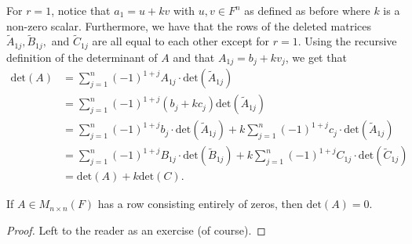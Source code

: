 \begin{remark}
   For \( r = 1  \), notice that \( {a}_{1} = u + kv  \) with \( u,v \in F^{n} \) as defined as before where \( k  \) is a non-zero scalar. Furthermore, we have that the rows of the deleted matrices \( {\tilde{A}}_{1j}, {\tilde{B}}_{1j},  \) and \( {\tilde{C}}_{1j} \) are all equal to each other except for \( r = 1  \). Using the recursive definition of the determinant of \( A  \) and that \( {A}_{1j} = {b}_{j} + k {v}_{j} \), we get that
   \begin{align*}
       \text{det}(A) &= \sum_{ j=1 }^{ n } (-1)^{1+j} {A}_{1j} \cdot \text{det}({\tilde{A}}_{1j}) \\
                     &= \sum_{ j=1 }^{ n } (-1)^{1+j} ({b}_{j} + {kc}_{j}) \text{det}({\tilde{A}}_{1j}) \\
                     &= \sum_{ j=1 }^{ n } (-1)^{1+j} {b}_{j} \cdot \text{det}({\tilde{A}}_{1j}) + k \sum_{ j=1 }^{ n } (-1)^{1+j}{c}_{j} \cdot \text{det} ({\tilde{A}}_{1j}) \\
                     &= \sum_{ j=1 }^{ n } (-1)^{1+j} {B}_{1j} \cdot \text{det}({\tilde{B}}_{1j}) + k \sum_{ j=1 }^{ n } (-1)^{1+j}{C}_{1j} \cdot \text{det} ({\tilde{C}}_{1j}) \\
                     &= \text{det}(A) + k \text{det}(C).
   \end{align*}
\end{remark}

\begin{corollary}
    If \( A \in {M}_{n \times n }(F) \) has a row consisting entirely of zeros, then \( \text{det}(A) =  0  \).
\end{corollary}
\begin{proof}
Left to the reader as an exercise (of course).
\end{proof}

